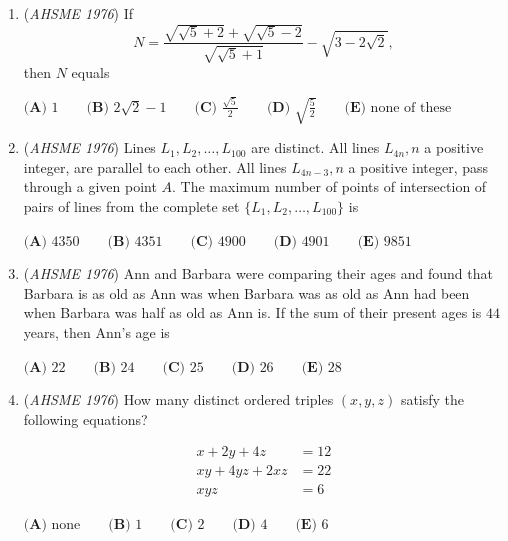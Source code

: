 \begin{enumerate}
 In the adjoining figure, every point of circle $\mathit{O'}$ is exterior to circle $\mathit{O}$. 
Let $\mathit{P}$ and $\mathit{Q}$ be the points of intersection of an internal common tangent with the two external common tangents. 
Then the length of $PQ$ is


 $\textbf{(A) }\text{the average of the lengths of the internal and external common tangents}\qquad\\ \textbf{(B) }\text{equal to the length of an external common tangent if and only if circles }\mathit{O}\text{ and }\mathit{O'} \text{have equal radii}\\ \textbf{(C) }\text{always equal to the length of an external common tangent}\qquad\\ \textbf{(D) }\text{greater than the length of an external common tangent}\qquad\\ \textbf{(E) }\text{the geometric mean of the lengths of the internal and external common tangents}$


	\item (\textit{AHSME 1976}) If 
 \[N=\frac{\sqrt{\sqrt{5}+2}+\sqrt{\sqrt{5}-2}}{\sqrt{\sqrt{5}+1}}-\sqrt{3-2\sqrt{2}},\] then $N$ equals


 $\textbf{(A) }1\qquad \textbf{(B) }2\sqrt{2}-1\qquad \textbf{(C) }\frac{\sqrt{5}}{2}\qquad \textbf{(D) }\sqrt{\frac{5}{2}}\qquad \textbf{(E) }\text{none of these}$


	\item (\textit{AHSME 1976}) Lines $L_1,L_2,\dots,L_{100}$ are distinct. All lines $L_{4n}, n$ a positive integer, are parallel to each other. 
All lines $L_{4n-3}, n$ a positive integer, pass through a given point $A.$ The maximum number of points of intersection of pairs of lines from the complete set $\{L_1,L_2,\dots,L_{100}\}$ is


 $\textbf{(A) }4350\qquad \textbf{(B) }4351\qquad \textbf{(C) }4900\qquad \textbf{(D) }4901\qquad  \textbf{(E) }9851$


	\item (\textit{AHSME 1976}) Ann and Barbara were comparing their ages and found that Barbara is as old as Ann was when Barbara was as old as 
Ann had been when Barbara was half as old as Ann is. If the sum of their present ages is $44$ years, then Ann's age is


 $\textbf{(A) }22\qquad \textbf{(B) }24\qquad \textbf{(C) }25\qquad \textbf{(D) }26\qquad  \textbf{(E) }28$


	\item (\textit{AHSME 1976}) How many distinct ordered triples $(x,y,z)$ satisfy the following equations?

 \begin{align*} x + 2y + 4z &= 12 \\ xy + 4yz + 2xz &= 22 \\ xyz &= 6 \end{align*}

$\textbf{(A) }\text{none}\qquad \textbf{(B) }1\qquad \textbf{(C) }2\qquad \textbf{(D) }4\qquad \textbf{(E) }6$


\end{enumerate}